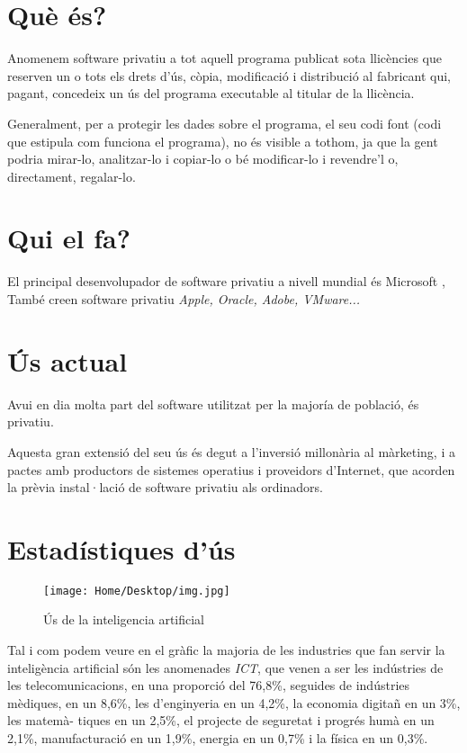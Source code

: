 \section{Què és?}

Anomenem software privatiu a tot aquell programa publicat sota llicències
que reserven un o tots els drets d'ús, còpia, modificació i distribució
al fabricant qui, pagant, concedeix un ús del programa executable al titular
de la llicència.

Generalment, per a protegir les dades sobre el programa, el seu codi font
(codi que estipula com funciona el programa), no és visible a tothom, ja 
que la gent podria mirar-lo, analitzar-lo i copiar-lo o bé modificar-lo i
revendre'l o, directament, regalar-lo. \cite{wikipediapropietari}\cite{gnucategories}

\section{Qui el fa?}

El principal desenvolupador de software privatiu a nivell mundial és Microsoft
\cite{gnumicrosoft}, 
També creen software privatiu \emph{Apple, Oracle, Adobe,
VMware...}

\section{Ús actual}

Avui en dia molta part del software utilitzat per la majoría de població, és privatiu.

Aquesta gran extensió del seu ús és degut a l'inversió millonària al màrketing, i a
pactes amb productors de sistemes operatius i proveidors d'Internet, que acorden la
prèvia instal·lació de software privatiu als ordinadors.

\section{Estadístiques d'ús}

\begin{figure}[ht!]
\centering
\texttt{[image: Home/Desktop/img.jpg]}
\caption{Ús de la inteligencia artificial}
\label{overflow}
\end{figure}

Tal i com podem veure en el gràfic la majoria de les industries que fan servir la
inteligència artificial són les anomenades \emph{ICT}, que venen a ser les indústries 
de les telecomunicacions, en una proporció del 76,8\%, seguides de indústries mèdiques,
en un 8,6\%, les d'enginyeria en un 4,2\%, la economia digitañ en un 3\%, les matemà-
tiques en un 2,5\%, el projecte de seguretat i progrés humà en un 2,1\%, manufacturació
en un 1,9\%, energia en un 0,7\% i la física en un 0,3\%.

